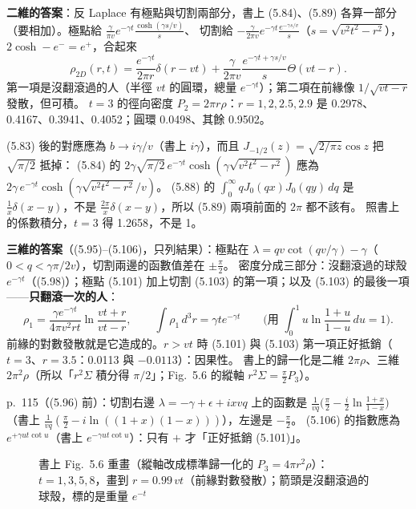 \textbf{二維的答案}：反 Laplace 有極點與切割兩部分，書上 (5.84)、(5.89) 各算一部分（要相加）。極點給 $\frac{\gamma}{\pi v}e^{-\gamma t}\frac{\cosh(\gamma s/v)}{s}$、
切割給 $-\frac{\gamma}{2\pi v}e^{-\gamma t}\frac{e^{-\gamma s/v}}{s}$（$s=\sqrt{v^2t^2-r^2}$），$2\cosh-e^{-}=e^{+}$，合起來
\[\rho_{2D}(r,t)=\frac{e^{-\gamma t}}{2\pi r}\delta(r-vt)+\frac{\gamma}{2\pi v}\frac{e^{-\gamma t+\gamma s/v}}{s}\Theta(vt-r).\]
第一項是沒翻滾過的人（半徑 $vt$ 的圓環，總量 $e^{-\gamma t}$）；第二項在前緣像 $1/\sqrt{vt-r}$ 發散，但可積。
$t=3$ 的徑向密度 $P_2=2\pi r\rho$：$r=1,2,2.5,2.9$ 是 0.2978、0.4167、0.3941、0.4052；圓環 0.0498、其餘 0.9502。
\begin{errbox}[p.~112--113，(5.83)(5.84)(5.88)(5.89)]
(5.83) 後的對應應為 $b\to i\gamma/v$（書上 $i\gamma$），而且 $J_{-1/2}(z)=\sqrt{2/\pi z}\cos z$ 把 $\sqrt{\pi/2}$ 抵掉：
(5.84) 的 $2\gamma\sqrt{\pi/2}\,e^{-\gamma t}\cosh(\gamma\sqrt{v^2t^2-r^2})$ 應為 $2\gamma\,e^{-\gamma t}\cosh(\gamma\sqrt{v^2t^2-r^2}/v)$。
(5.88) 的 $\int_0^\infty qJ_0(qx)J_0(qy)\,dq$ 是 $\frac1x\delta(x-y)$，不是 $\frac{2\pi}{x}\delta(x-y)$，所以 (5.89) 兩項前面的 $2\pi$ 都不該有。
照書上的係數積分，$t=3$ 得 1.2658，不是 1。
\end{errbox}

\textbf{三維的答案}（(5.95)--(5.106)，只列結果）：極點在 $\lambda=qv\cot(qv/\gamma)-\gamma$（$0<q<\gamma\pi/2v$），切割兩邊的函數值差在 $\pm\frac\pi2$。
密度分成三部分：沒翻滾過的球殼 $e^{-\gamma t}$（(5.98)）；極點 (5.101) 加上切割 (5.103) 的第一項；以及 (5.103) 的最後一項——\textbf{只翻滾一次的人}：
\[\rho_1=\frac{\gamma e^{-\gamma t}}{4\pi v^2rt}\ln\frac{vt+r}{vt-r},\qquad \int\rho_1\,d^3r=\gamma te^{-\gamma t}\qquad\Big(\text{用 }\int_0^1u\ln\frac{1+u}{1-u}\,du=1\Big).\]
前緣的對數發散就是它造成的。$r>vt$ 時 (5.101) 與 (5.103) 第一項正好抵銷（$t=3$、$r=3.5$：0.0113 與 $-0.0113$）：因果性。
書上的歸一化是二維 $2\pi\rho$、三維 $2\pi^2\rho$（所以「$r^2\Sigma$ 積分得 $\pi/2$」；Fig.~5.6 的縱軸 $r^2\Sigma=\frac\pi2P_3$）。
\begin{errbox}[p.~115、p.~117]
p.~115（(5.96) 前）：切割右邊 $\lambda=-\gamma+\epsilon+ixvq$ 上的函數是 $\frac1{vq}\big(\frac\pi2-\frac i2\ln\frac{1+x}{1-x}\big)$（書上 $\frac1{vq}(\frac\pi2-i\ln((1+x)(1-x)))$），左邊是 $-\frac\pi2$。
(5.106) 的指數應為 $e^{+\gamma ut\cot u}$（書上 $e^{-\gamma ut\cot u}$）：只有 $+$ 才「正好抵銷 (5.101)」。
\end{errbox}

\begin{figure}[htbp]
\centering
\FiveFigRT
\caption{書上 Fig.~5.6 重畫（縱軸改成標準歸一化的 $P_3=4\pi r^2\rho$）：$t=1,3,5,8$，畫到 $r=0.99\,vt$（前緣對數發散）；箭頭是沒翻滾過的球殼，標的是重量 $e^{-t}$}\label{five-fig-rt}
\end{figure}

